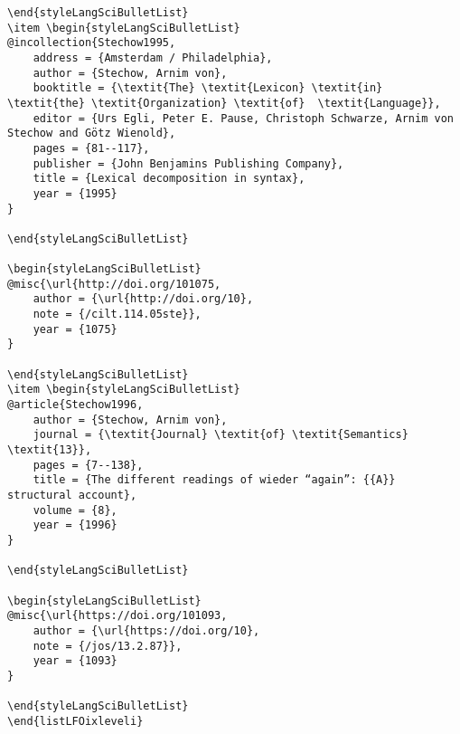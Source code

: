 \documentclass[output=paper,modfonts,nonflat,
 hidelinks
]{langsci/langscibook}
\begin{document}
\begin{verbatim}
\end{styleLangSciBulletList}
\item \begin{styleLangSciBulletList}
@incollection{Stechow1995,
	address = {Amsterdam / Philadelphia},
	author = {Stechow, Arnim von},
	booktitle = {\textit{The} \textit{Lexicon} \textit{in} \textit{the} \textit{Organization} \textit{of}  \textit{Language}},
	editor = {Urs Egli, Peter E. Pause, Christoph Schwarze, Arnim von Stechow and Götz Wienold},
	pages = {81--117},
	publisher = {John Benjamins Publishing Company},
	title = {Lexical decomposition in syntax},
	year = {1995}
}

\end{styleLangSciBulletList}

\begin{styleLangSciBulletList}
@misc{\url{http://doi.org/101075,
	author = {\url{http://doi.org/10},
	note = {/cilt.114.05ste}},
	year = {1075}
}

\end{styleLangSciBulletList}
\item \begin{styleLangSciBulletList}
@article{Stechow1996,
	author = {Stechow, Arnim von},
	journal = {\textit{Journal} \textit{of} \textit{Semantics} \textit{13}},
	pages = {7--138},
	title = {The different readings of wieder “again”: {{A}} structural account},
	volume = {8},
	year = {1996}
}

\end{styleLangSciBulletList}

\begin{styleLangSciBulletList}
@misc{\url{https://doi.org/101093,
	author = {\url{https://doi.org/10},
	note = {/jos/13.2.87}},
	year = {1093}
}

\end{styleLangSciBulletList}
\end{listLFOixleveli}
\end{verbatim}
\end{document}

